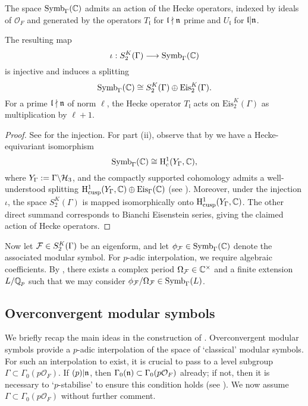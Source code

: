 \documentclass[a4paper,10pt]{article}
\newcommand{\fl}{\mathfrak{l}}
\newcommand{\cO}{\mathcal{O}}
\numberwithin{equation}{section}
\begin{document}
The space $\mathrm{Symb}_\Gamma(\mathbb{C})$ admits an action of the Hecke operators, indexed by ideals of $\cO_F$ and generated by the operators $T_{\fl}$ for $\fl\nmid\n$ prime and $U_{\fl}$ for $\fl|\n$. 

\begin{proposition}
 The resulting map 
    \[
        \iota : S_2^K(\Gamma) \longrightarrow \mathrm{Symb}_\Gamma(\mathbb{C})
    \]
    is injective and induces a splitting
    \[
        \mathrm{Symb}_\Gamma(\mathbb{C}) \cong S_2^K(\Gamma) \oplus \mathrm{Eis}_2^K(\Gamma).
    \]
    For a prime $\fl\nmid \n$ of norm $\ell$, the Hecke operator $T_{\fl}$ acts on $\mathrm{Eis}_2^K(\Gamma)$ as multiplication by $\ell+1$.
\end{proposition}
\begin{proof}
    See \cite{Wil17} for the injection. For part (ii), observe that by \cite[Lemma 8.2]{BW17} we have a Hecke-equivariant isomorphism
    \[
        \mathrm{Symb}_\Gamma(\mathbb{C}) \cong \mathrm{H}^1_{\mathrm{c}}(Y_\Gamma, \mathbb{C}),
    \]
    where $Y_\Gamma := \Gamma\backslash\mathcal{H}_3$, and the compactly supported cohomology admits a well-understood splitting $\mathrm{H}^1_{\mathrm{cusp}}(Y_\Gamma,\mathbb{C}) \oplus \mathrm{Eis}_\Gamma(\mathbb{C})$ (see \cite[\S3.2.5]{Har87}). Moreover, under the injection $\iota$, the space $S_2^K(\Gamma)$ is mapped isomorphically onto $\mathrm{H}^1_{\mathrm{cusp}}(Y_\Gamma,\mathbb{C})$. The other direct summand corresponds to Bianchi Eisenstein series, giving the claimed action of Hecke operators.
\end{proof}

Now let $\mathcal{F} \in S_2^K(\Gamma)$ be an eigenform, and let $\phi_{\mathcal{F}} \in \mathrm{Symb}_\Gamma(\mathbb{C})$ denote the associated modular symbol. For $p$-adic interpolation, we require algebraic coefficients. By \cite[\S8]{Hid94}, there exists a complex period $\Omega_{\mathcal{F}} \in \mathbb{C}^\times$ and a finite extension $L/\mathbb{Q}_p$ such that we may consider $\phi_{\mathcal{F}}/\Omega_{\mathcal{F}} \in \mathrm{Symb}_{\Gamma}(L)$.



\subsection{Overconvergent modular symbols}
We briefly recap the main ideas in the construction of \cite{Wil17}. Overconvergent modular symbols provide a $p$-adic interpolation of the space of `classical' modular symbols. For such an interpolation to exist, it is crucial to pass to a level subgroup $\Gamma \subset \Gamma_0(p\cO_F).$ If $(p)|\mathfrak{n}$, then $\Gamma_0(\n) \subset \Gamma_0(p\cO_F)$ already; if not, then it is necessary to `$p$-stabilise' to ensure this condition holds (see \cite[\S2.4]{BW18}). We now assume $\Gamma \subset \Gamma_0(p\cO_F)$ without further comment.
\end{document}
